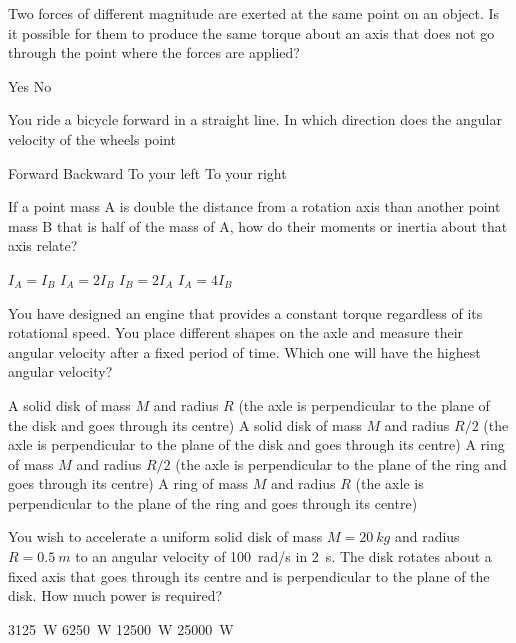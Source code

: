 \question Two forces of different magnitude are exerted at the same point on an object. Is it possible for them to produce the same torque about an axis that does not go through the point where the forces are applied?
\begin{checkboxes}
\CorrectChoice Yes \correct
\choice No
\end{checkboxes}

\question You ride a bicycle forward in a straight line. In which direction does the angular velocity of the wheels point
\begin{checkboxes}
\choice Forward
\choice Backward
\CorrectChoice To your left \correct
\choice To your right
\end{checkboxes}

\question If a point mass A is double the distance from a rotation axis than another point mass B that is half of the mass of A, how do their moments or inertia about that axis relate?
\begin{checkboxes}
\choice $I_A=I_B$
\CorrectChoice $I_A=2I_B$ \correct
\choice $I_B=2I_A$
\choice $I_A=4I_B$
\end{checkboxes}


\question You have designed an engine that provides a constant torque regardless of its rotational speed. You place different shapes on the axle and measure their angular velocity after a fixed period of time. Which one will have the highest angular velocity?
\begin{checkboxes} 
\choice A solid disk of mass $M$ and radius $R$ (the axle is perpendicular to the plane of the disk and goes through its centre)
\CorrectChoice A solid disk of mass $M$ and radius $R/2$ (the axle is perpendicular to the plane of the disk and goes through its centre) \correct
\choice A ring of mass $M$ and radius $R/2$ (the axle is perpendicular to the plane of the ring and goes through its centre)
\choice A ring of mass $M$ and radius $R$ (the axle is perpendicular to the plane of the ring and goes through its centre)
\end{checkboxes}

\question You wish to accelerate a uniform solid disk of mass $M=\SI{20}{kg}$ and radius $R=\SI{0.5}{m}$ to an angular velocity of \SI{100}{rad/s} in \SI{2}{s}. The disk rotates about a fixed axis that goes through its centre and is perpendicular to the plane of the disk. How much power is required?
 \begin{checkboxes} 
\choice \SI{3125}{W}
\CorrectChoice \SI{6250}{W} \correct
\choice \SI{12500}{W}
\choice \SI{25000}{W}
\end{checkboxes}

